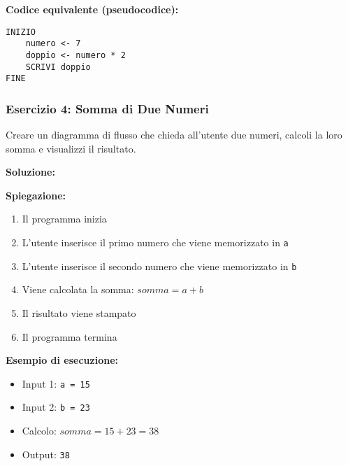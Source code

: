 \documentclass[a4paper,16pt]{article}
\begin{document}
\textbf{Codice equivalente (pseudocodice):}
\begin{lstlisting}
INIZIO
    numero <- 7
    doppio <- numero * 2
    SCRIVI doppio
FINE
\end{lstlisting}

\newpage
\subsubsection{Esercizio 4: Somma di Due Numeri}

\begin{tcolorbox}[colback=blue!5!white,colframe=blue!75!black,title=Traccia]
Creare un diagramma di flusso che chieda all'utente due numeri, calcoli la loro somma e visualizzi il risultato.
\end{tcolorbox}

\textbf{Soluzione:}

\begin{center}
\end{center}

\textbf{Spiegazione:}
\begin{enumerate}
    \item Il programma inizia
    \item L'utente inserisce il primo numero che viene memorizzato in \texttt{a}
    \item L'utente inserisce il secondo numero che viene memorizzato in \texttt{b}
    \item Viene calcolata la somma: $somma = a + b$
    \item Il risultato viene stampato
    \item Il programma termina
\end{enumerate}

\textbf{Esempio di esecuzione:}
\begin{itemize}
    \item Input 1: \texttt{a = 15}
    \item Input 2: \texttt{b = 23}
    \item Calcolo: $somma = 15 + 23 = 38$
    \item Output: \texttt{38}
\end{itemize}
\end{document}
